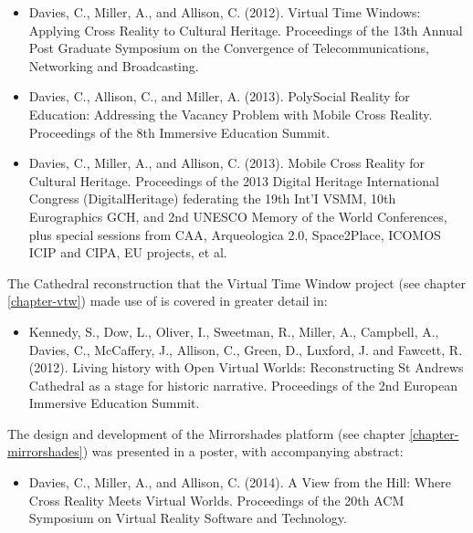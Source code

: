 \begin{itemize}

	\item Davies, C., Miller, A., and Allison, C. (2012). Virtual Time Windows: Applying Cross Reality to Cultural Heritage. Proceedings of the 13th Annual Post Graduate Symposium on the Convergence of Telecommunications, Networking and Broadcasting.
	
	\item Davies, C., Allison, C., and Miller, A. (2013). PolySocial Reality for Education: Addressing the Vacancy Problem with Mobile Cross Reality. Proceedings of the 8th Immersive Education Summit.

	\item Davies, C., Miller, A., and Allison, C. (2013). Mobile Cross Reality for Cultural Heritage. Proceedings of the 2013 Digital Heritage International Congress (DigitalHeritage) federating the 19th Int'I VSMM, 10th Eurographics GCH, and 2nd UNESCO Memory of the World Conferences, plus special sessions from CAA, Arqueologica 2.0, Space2Place, ICOMOS ICIP and CIPA, EU projects, et al.

\end{itemize}


The Cathedral reconstruction that the Virtual Time Window project (see chapter \ref{chapter-vtw}) made use of is covered in greater detail in:

\begin{itemize}

	\item Kennedy, S., Dow, L., Oliver, I., Sweetman, R., Miller, A., Campbell, A., Davies, C., McCaffery, J., Allison, C., Green, D., Luxford, J. and Fawcett, R. (2012). Living history with Open Virtual Worlds: Reconstructing St Andrews Cathedral as a stage for historic narrative. Proceedings of the 2nd European Immersive Education Summit.

\end{itemize}


The design and development of the Mirrorshades platform (see chapter \ref{chapter-mirrorshades}) was presented in a poster, with accompanying abstract:

\begin{itemize}
	\item Davies, C., Miller, A., and Allison, C. (2014). A View from the Hill: Where Cross Reality Meets Virtual Worlds.  Proceedings of the 20th ACM Symposium on Virtual Reality Software and Technology.	
\end{itemize}

